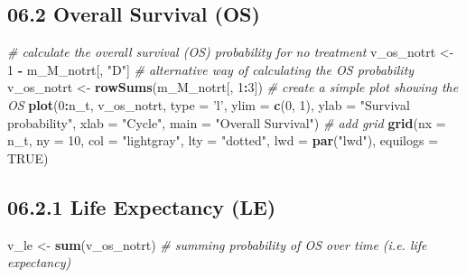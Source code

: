 \documentclass[
]{article}
\newenvironment{Shaded}{\begin{snugshade}}{\end{snugshade}}
\newcommand{\CommentTok}[1]{\textcolor[rgb]{0.56,0.35,0.01}{\textit{#1}}}
\newcommand{\DataTypeTok}[1]{\textcolor[rgb]{0.13,0.29,0.53}{#1}}
\newcommand{\DecValTok}[1]{\textcolor[rgb]{0.00,0.00,0.81}{#1}}
\newcommand{\KeywordTok}[1]{\textcolor[rgb]{0.13,0.29,0.53}{\textbf{#1}}}
\newcommand{\NormalTok}[1]{#1}
\newcommand{\OperatorTok}[1]{\textcolor[rgb]{0.81,0.36,0.00}{\textbf{#1}}}
\newcommand{\OtherTok}[1]{\textcolor[rgb]{0.56,0.35,0.01}{#1}}
\newcommand{\StringTok}[1]{\textcolor[rgb]{0.31,0.60,0.02}{#1}}
\begin{document}
\hypertarget{overall-survival-os}{%
\subsection{06.2 Overall Survival (OS)}\label{overall-survival-os}}

\begin{Shaded}
\begin{Highlighting}[]
\CommentTok{# calculate the overall survival (OS) probability for no treatment}
\NormalTok{v_os_notrt <-}\StringTok{ }\DecValTok{1} \OperatorTok{-}\StringTok{ }\NormalTok{m_M_notrt[, }\StringTok{"D"}\NormalTok{]    }
\CommentTok{# alternative way of calculating the OS probability   }
\NormalTok{v_os_notrt <-}\StringTok{ }\KeywordTok{rowSums}\NormalTok{(m_M_notrt[, }\DecValTok{1}\OperatorTok{:}\DecValTok{3}\NormalTok{])  }
\CommentTok{# create a simple plot showing the OS}
\KeywordTok{plot}\NormalTok{(}\DecValTok{0}\OperatorTok{:}\NormalTok{n_t, v_os_notrt, }\DataTypeTok{type =} \StringTok{'l'}\NormalTok{, }
     \DataTypeTok{ylim =} \KeywordTok{c}\NormalTok{(}\DecValTok{0}\NormalTok{, }\DecValTok{1}\NormalTok{),}
     \DataTypeTok{ylab =} \StringTok{"Survival probability"}\NormalTok{,}
     \DataTypeTok{xlab =} \StringTok{"Cycle"}\NormalTok{,}
     \DataTypeTok{main =} \StringTok{"Overall Survival"}\NormalTok{)          }
\CommentTok{# add grid }
\KeywordTok{grid}\NormalTok{(}\DataTypeTok{nx =}\NormalTok{ n_t, }\DataTypeTok{ny =} \DecValTok{10}\NormalTok{, }\DataTypeTok{col =} \StringTok{"lightgray"}\NormalTok{, }\DataTypeTok{lty =} \StringTok{"dotted"}\NormalTok{, }\DataTypeTok{lwd =} \KeywordTok{par}\NormalTok{(}\StringTok{"lwd"}\NormalTok{), }
     \DataTypeTok{equilogs =} \OtherTok{TRUE}\NormalTok{) }
\end{Highlighting}
\end{Shaded}

\hypertarget{life-expectancy-le}{%
\subsection{06.2.1 Life Expectancy (LE)}\label{life-expectancy-le}}

\begin{Shaded}
\begin{Highlighting}[]
\NormalTok{v_le <-}\StringTok{ }\KeywordTok{sum}\NormalTok{(v_os_notrt)  }\CommentTok{# summing probability of OS over time  (i.e. life expectancy)}
\end{Highlighting}
\end{Shaded}
\end{document}
